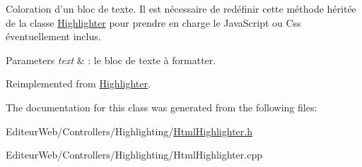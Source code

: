 Coloration d'un bloc de texte. Il est nécessaire de redéfinir cette méthode héritée de la classe \hyperlink{class_highlighter}{Highlighter} pour prendre en charge le JavaScript ou Css éventuellement inclus. 


\begin{DoxyParams}{Parameters}
{\em text} & : le bloc de texte à formatter. \\
\hline
\end{DoxyParams}


Reimplemented from \hyperlink{class_highlighter_ad07c7fd55d2ce2c675bca607b9370488}{Highlighter}.



The documentation for this class was generated from the following files:\begin{DoxyCompactItemize}
\item 
EditeurWeb/Controllers/Highlighting/\hyperlink{_html_highlighter_8h}{HtmlHighlighter.h}\item 
EditeurWeb/Controllers/Highlighting/HtmlHighlighter.cpp\end{DoxyCompactItemize}
